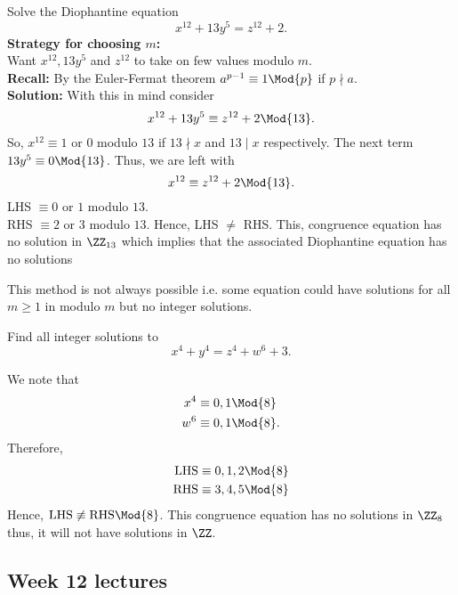 \documentclass[12pt, a4paper]{article}
\begin{document}
\begin{example}
    Solve the Diophantine equation
    \[x^{12}+13y^5 =z^{12}+2.\]
    \textbf{Strategy for choosing \(m\):}\\
    Want \(x^{12},13y^5\) and \(z^{12}\) to take on few values modulo \(m\). \\
    \textbf{Recall:} By the Euler-Fermat theorem \(a^{p-1} \equiv 1 \Mod{p}\) if \(p \nmid a\). \\
    \textbf{Solution:} With this in mind consider
    \[x^{12}+13y^5 \equiv z^{12}+2 \Mod{13}.\]
    So, \(x^{12} \equiv 1\) or \(0\) modulo \(13\) if \(13 \nmid x\) and \(13 \mid x\) respectively. The next term \(13y^5 \equiv 0 \Mod{13}\). Thus, we are left with
    \[x^{12} \equiv z^{12} +2 \Mod{13}.\]
    LHS \(\equiv 0\) or \(1\) modulo \(13\). \\
    RHS \(\equiv 2\) or \(3\) modulo \(13\).
    Hence, LHS \(\neq\) RHS. This, congruence equation has no solution in \(\ZZ_{13}\) which implies that the associated Diophantine equation has no solutions
\end{example}

\begin{mdremark}
    This method is not always possible i.e. some equation could have solutions for all \(m\geq 1\) in modulo \(m\) but no integer solutions.
\end{mdremark}

\begin{example}
    Find all integer solutions to 
    \[x^4+y^4=z^4+w^6+3.\]
    \begin{solution}
        We note that 
        \[\begin{aligned}
            x^4 &\equiv 0,1 \Mod{8} \\
            w^6 &\equiv 0,1 \Mod{8}.
        \end{aligned}\]
        Therefore,
        \[\begin{aligned}
            \text{LHS} &\equiv  0,1,2 \Mod{8} \\
            \text{RHS} &\equiv 3,4,5 \Mod{8}
        \end{aligned}\]
        Hence, \(\text{LHS}\not\equiv \text{RHS} \Mod{8}\). This congruence equation has no solutions in \(\ZZ_8\) thus, it will not have solutions in \(\ZZ\).
    \end{solution}
\end{example}

\subsection{Week 12 lectures}
\end{document}
